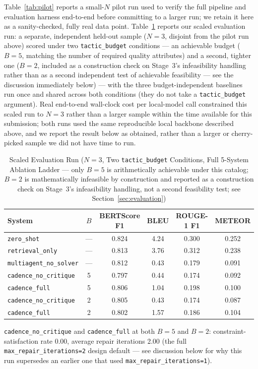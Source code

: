\documentclass[lettersize,journal]{IEEEtran}
\begin{document}
Table~\ref{tab:pilot} reports a small-$N$ pilot run used to verify the full pipeline and evaluation harness end-to-end before committing to a larger run; we retain it here as a sanity-checked, fully real data point. Table~\ref{tab:scaled} reports our scaled evaluation run: a separate, independent held-out sample ($N=3$, disjoint from the pilot run above) scored under two \texttt{tactic\_budget} conditions --- an achievable budget ($B=5$, matching the number of required quality attributes) and a second, tighter one ($B=2$, included as a construction check on Stage~3's infeasibility handling rather than as a second independent test of achievable feasibility --- see the discussion immediately below) --- with the three budget-independent baselines run once and shared across both conditions (they do not take a \texttt{tactic\_budget} argument). Real end-to-end wall-clock cost per local-model call constrained this scaled run to $N=3$ rather than a larger sample within the time available for this submission; both runs used the same reproducible local backbone described above, and we report the result below as obtained, rather than a larger or cherry-picked sample we did not have time to run.

\begin{table}[t]
\caption{Scaled Evaluation Run ($N=3$, Two \texttt{tactic\_budget} Conditions, Full 5-System Ablation Ladder --- only $B=5$ is arithmetically achievable under this catalog; $B=2$ is mathematically infeasible by construction and reported as a construction check on Stage~3's infeasibility handling, not a second feasibility test; see Section~\ref{sec:evaluation})\label{tab:scaled}}
\centering
\begin{tabular}{@{}lccccc@{}}
\toprule
System & $B$ & BERTScore F1 & BLEU & ROUGE-1 F1 & METEOR \\
\midrule
\texttt{zero\_shot}             & --- & 0.824 & 4.24 & 0.300 & 0.252 \\
\texttt{retrieval\_only}        & --- & 0.813 & 3.76 & 0.312 & 0.238 \\
\texttt{multiagent\_no\_solver} & --- & 0.812 & 0.43 & 0.179 & 0.091 \\
\texttt{cadence\_no\_critique}  & 5   & 0.797 & 0.44 & 0.174 & 0.092 \\
\texttt{cadence\_full}          & 5   & 0.806 & 1.04 & 0.198 & 0.100 \\
\texttt{cadence\_no\_critique}  & 2   & 0.805 & 0.43 & 0.174 & 0.087 \\
\texttt{cadence\_full}          & 2   & 0.802 & 1.57 & 0.186 & 0.104 \\
\bottomrule
\end{tabular}

\vspace{2pt}
\footnotesize \texttt{cadence\_no\_critique} and \texttt{cadence\_full} at both $B=5$ and $B=2$: constraint-satisfaction rate 0.00, average repair iterations 2.00 (the full \texttt{max\_repair\_iterations=2} design default --- see discussion below for why this run supersedes an earlier one that used \texttt{max\_repair\_iterations=1}).
\end{table}
\end{document}
